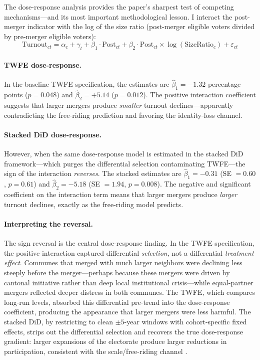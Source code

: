 \documentclass[12pt]{article}
\begin{document}
The dose-response analysis provides the paper's sharpest test of competing mechanisms---and its most important methodological lesson. I interact the post-merger indicator with the log of the size ratio (post-merger eligible voters divided by pre-merger eligible voters):
\begin{equation}
\label{eq:dose}
    \text{Turnout}_{ct} = \alpha_c + \gamma_t + \beta_1 \cdot \text{Post}_{ct} + \beta_2 \cdot \text{Post}_{ct} \times \log(\text{SizeRatio}_c) + \varepsilon_{ct}
\end{equation}

\paragraph{TWFE dose-response.} In the baseline TWFE specification, the estimates are $\hat{\beta}_1 = -1.32$ percentage points ($p = 0.048$) and $\hat{\beta}_2 = +5.14$ ($p = 0.012$). The positive interaction coefficient suggests that larger mergers produce \textit{smaller} turnout declines---apparently contradicting the free-riding prediction and favoring the identity-loss channel.

\paragraph{Stacked DiD dose-response.} However, when the same dose-response model is estimated in the stacked DiD framework---which purges the differential selection contaminating TWFE---the sign of the interaction \textit{reverses}. The stacked estimates are $\hat{\beta}_1 = -0.31$ (SE $= 0.60$, $p = 0.61$) and $\hat{\beta}_2 = -5.18$ (SE $= 1.94$, $p = 0.008$). The negative and significant coefficient on the interaction term means that larger mergers produce \textit{larger} turnout declines, exactly as the free-riding model predicts.

\paragraph{Interpreting the reversal.} The sign reversal is the central dose-response finding. In the TWFE specification, the positive interaction captured differential \textit{selection}, not a differential \textit{treatment effect}. Communes that merged with much larger neighbors were declining less steeply before the merger---perhaps because these mergers were driven by cantonal initiative rather than deep local institutional crisis---while equal-partner mergers reflected deeper distress in both communes. The TWFE, which compares long-run levels, absorbed this differential pre-trend into the dose-response coefficient, producing the appearance that larger mergers were less harmful. The stacked DiD, by restricting to clean $\pm 5$-year windows with cohort-specific fixed effects, strips out the differential selection and recovers the true dose-response gradient: larger expansions of the electorate produce larger reductions in participation, consistent with the scale/free-riding channel \citep{olson1965logic}.
\end{document}
